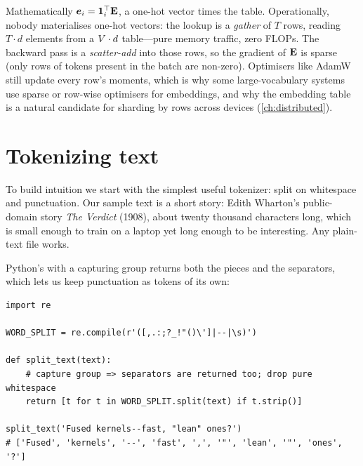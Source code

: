 \begin{systemslens}
Mathematically $\bm{e}_i = \bm{1}_i^\top \mathbf{E}$, a one-hot vector times the table.
Operationally, nobody materialises one-hot vectors: the lookup is a \emph{gather} of $T$ rows,
reading $T\cdot d$ elements from a $V\cdot d$ table---pure memory traffic, zero FLOPs.
The backward pass is a \emph{scatter-add} into those rows, so the gradient of $\mathbf{E}$ is sparse
(only rows of tokens present in the batch are non-zero). Optimisers like AdamW still update every
row's moments, which is why some large-vocabulary systems use sparse or row-wise optimisers for
embeddings, and why the embedding table is a natural candidate for sharding by rows across devices
(\cref{ch:distributed}).
\end{systemslens}

\section{Tokenizing text}\label{sec:text:tokenizing}

To build intuition we start with the simplest useful tokenizer: split on whitespace and
punctuation. Our sample text is a short story: Edith Wharton's
public-domain story \emph{The Verdict} (1908), about twenty thousand characters long, which is
small enough to train on a laptop yet long enough to be interesting. Any plain-text file works.

Python's  with a capturing group returns both the pieces and the separators, which
lets us keep punctuation as tokens of its own:

\begin{lstlisting}[caption={A regular-expression word splitter (Lab 3, Part A).},label={lst:text:split}]
import re

WORD_SPLIT = re.compile(r'([,.:;?_!"()\']|--|\s)')

def split_text(text):
    # capture group => separators are returned too; drop pure whitespace
    return [t for t in WORD_SPLIT.split(text) if t.strip()]

split_text('Fused kernels--fast, "lean" ones?')
# ['Fused', 'kernels', '--', 'fast', ',', '"', 'lean', '"', 'ones', '?']
\end{lstlisting}

